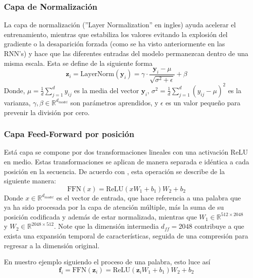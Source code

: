\documentclass[12pt,letterpaper]{article}
\begin{document}
\subsubsection{Capa de Normalización}
La capa de normalización (''Layer Normalization'' en ingles) ayuda acelerar el entrenamiento, mientras que estabiliza los valores evitando la explosión del gradiente o la desaparición forzada (como se ha visto anteriormente en las RNN's) y hace que las diferentes entradas del modelo permanezcan dentro de una misma escala. Esta se define de la siguiente forma
\begin{equation}
    \textbf{z}_i=\text{LayerNorm}(\textbf{y}_i ) = \gamma \cdot \frac{\textbf{y}_i - \mu}{\sqrt{\sigma^2+\epsilon}}+\beta
\end{equation}
Donde, $\mu=\frac{1}{d}\sum_{j=1}^d y_{ij}$ es la media del vector $\textbf{y}_i$, $\sigma^2=\frac{1}{d}\sum_{j=1}^d(y_{ij}-\mu)^2$ es la varianza, $\gamma, \beta \in \mathbb{R}^{d_{model}}$ son parámetros aprendidos, y $\epsilon$ es un valor pequeño para prevenir la división por cero.

\subsubsection{Capa Feed-Forward por posición}
Está capa se compone por dos transformaciones lineales con una activación ReLU en medio. Estas transformaciones se aplican de manera separada e idéntica a cada posición en la secuencia. De acuerdo con \cite{vaswani2017attention}, esta operación se describe de la siguiente manera:
\begin{equation}
    \text{FFN}(x)=\text{ReLU}(xW_1+b_1)W_2+b_2
\end{equation}
Donde $x\in \mathbb{R}^{d_{model}}$ es el vector de entrada, que hace referencia a una palabra que ya ha sido procesada por la capa de atención múltiple, más la suma de su posición codificada y además de estar normalizada, mientras que $W_1\in \mathbb{R}^{512\times 2048}$ y $W_2 \in \mathbb{R}^{2048\times 512}$. Note que la dimensión intermedia $d_{ff}=2048$ contribuye a que exista una expansión temporal de características, seguida de una compresión para regresar a la dimensión original.

En nuestro ejemplo siguiendo el proceso de una palabra, esto luce así
\begin{equation}
    \textbf{f}_i =\text{FFN}(\textbf{z}_i) = \text{ReLU}(\textbf{z}_iW_1+b_1)W_2+b_2
\end{equation}
\end{document}
